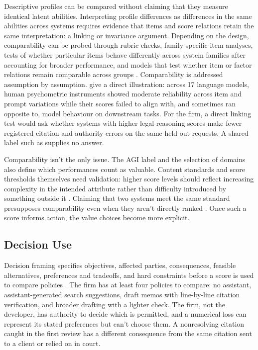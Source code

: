 \documentclass[12pt]{article}
\begin{document}
Descriptive profiles can be compared without claiming that they measure identical latent abilities. Interpreting profile differences as differences in the same abilities across systems requires evidence that items and score relations retain the same interpretation: a linking or invariance argument. Depending on the design, comparability can be probed through rubric checks, family-specific item analyses, tests of whether particular items behave differently across system families after accounting for broader performance, and models that test whether item or factor relations remain comparable across groups \citep{meredith1993measurementInvariance}. Comparability is addressed assumption by assumption. \Textcite{jung2026psychometric} give a direct illustration: across 17 language models, human psychometric instruments showed moderate reliability across item and prompt variations while their scores failed to align with, and sometimes ran opposite to, model behaviour on downstream tasks. For the firm, a direct linking test would ask whether systems with higher legal-reasoning scores make fewer registered citation and authority errors on the same held-out requests. A shared label such as  supplies no answer.

Comparability isn't the only issue. The AGI label and the selection of domains also define which performances count as valuable. Content standards and score thresholds themselves need validation: higher score levels should reflect increasing complexity in the intended attribute rather than difficulty introduced by something outside it \citep[6]{messick1995standardsValidity}. Claiming that two systems meet the same standard presupposes comparability even when they aren't directly ranked \citep[7]{messick1995standardsValidity}. Once such a score informs action, the value choices become more explicit.

\subsection{Decision Use}\label{ssec:decision_use}

Decision framing specifies objectives, affected parties, consequences, feasible alternatives, preferences and tradeoffs, and hard constraints before a score is used to compare policies \citep{KeeneyRaiffa1993}. The firm has at least four policies to compare: no assistant, assistant-generated search suggestions, draft memos with line-by-line citation verification, and broader drafting with a lighter check. The firm, not the developer, has authority to decide which is permitted, and a numerical loss can represent its stated preferences but can't choose them. A nonresolving citation caught in the first review has a different consequence from the same citation sent to a client or relied on in court.
\end{document}
